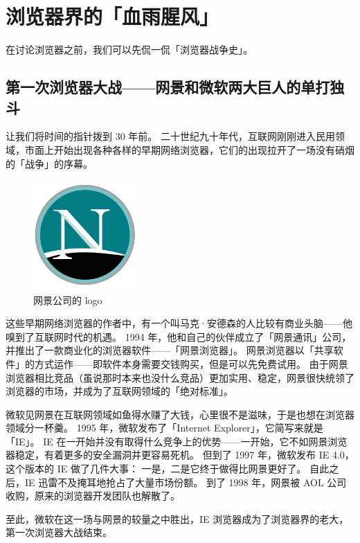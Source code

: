 \section{浏览器界的「血雨腥风」}

在讨论浏览器之前，我们可以先侃一侃「浏览器战争史」。

\subsection[第一次浏览器大战——网景和微软两大巨人的单打独斗]{第一次浏览器大战{\normalsize ——网景和微软两大巨人的单打独斗}}

让我们将时间的指针拨到 30 年前。
二十世纪九十年代，互联网刚刚进入民用领域，市面上开始出现各种各样的早期网络浏览器，它们的出现拉开了一场没有硝烟的「战争」的序幕。

\begin{figure}
  \centering
  \includegraphics[width=4cm]{assets/Netscape.jpg}
  \caption{网景公司的 logo}
  \label{Netscape}
\end{figure}

这些早期网络浏览器的作者中，有一个叫马克·安德森的人比较有商业头脑——他嗅到了互联网时代的机遇。
1994 年，他和自己的伙伴成立了「网景通讯」公司，并推出了一款商业化的浏览器软件——「网景浏览器」。
网景浏览器以「共享软件」的方式运作——即软件本身需要交钱购买，但是可以先免费试用。
由于网景浏览器相比竞品（虽说那时本来也没什么竞品）更加实用、稳定，网景很快统领了浏览器的市场，并成为了互联网领域的「绝对标准」。

微软见网景在互联网领域如鱼得水赚了大钱，心里很不是滋味，于是也想在浏览器领域分一杯羹。
1995 年，微软发布了「Internet Explorer」，它简写来就是「IE」。
IE 在一开始并没有取得什么竞争上的优势——一开始，它不如网景浏览器稳定，有着更多的安全漏洞并更容易死机。
但到了 1997 年，微软发布 IE 4.0，这个版本的 IE 做了几件大事：
一是，二是它终于做得比网景更好了。
自此之后，IE 迅雷不及掩耳地抢占了大量市场份额。
到了 1998 年，网景被 AOL 公司收购，原来的浏览器开发团队也解散了。

至此，微软在这一场与网景的较量之中胜出，IE 浏览器成为了浏览器界的老大，第一次浏览器大战结束。

